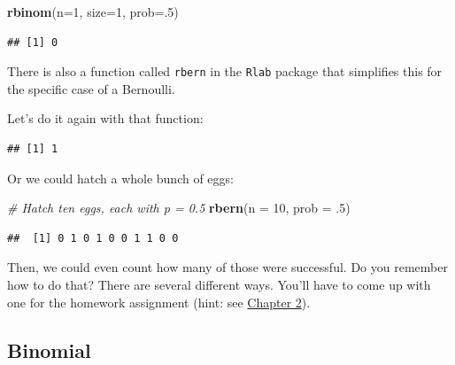 \documentclass[
]{book}
\newenvironment{Shaded}{\begin{snugshade}}{\end{snugshade}}
\newcommand{\CommentTok}[1]{\textcolor[rgb]{0.56,0.35,0.01}{\textit{#1}}}
\newcommand{\DataTypeTok}[1]{\textcolor[rgb]{0.13,0.29,0.53}{#1}}
\newcommand{\DecValTok}[1]{\textcolor[rgb]{0.00,0.00,0.81}{#1}}
\newcommand{\FloatTok}[1]{\textcolor[rgb]{0.00,0.00,0.81}{#1}}
\newcommand{\KeywordTok}[1]{\textcolor[rgb]{0.13,0.29,0.53}{\textbf{#1}}}
\newcommand{\NormalTok}[1]{#1}
\begin{document}
\begin{Shaded}
\begin{Highlighting}[]
\KeywordTok{rbinom}\NormalTok{(}\DataTypeTok{n=}\DecValTok{1}\NormalTok{, }\DataTypeTok{size=}\DecValTok{1}\NormalTok{, }\DataTypeTok{prob=}\NormalTok{.}\DecValTok{5}\NormalTok{)}
\end{Highlighting}
\end{Shaded}

\begin{verbatim}
## [1] 0
\end{verbatim}

There is also a function called \texttt{rbern} in the \texttt{Rlab} package that simplifies this for the specific case of a Bernoulli.

Let's do it again with that function:

\begin{Shaded}
\end{Shaded}

\begin{verbatim}
## [1] 1
\end{verbatim}

Or we could hatch a whole bunch of eggs:

\begin{Shaded}
\begin{Highlighting}[]
\CommentTok{# Hatch ten eggs, each with p = 0.5}
\KeywordTok{rbern}\NormalTok{(}\DataTypeTok{n =} \DecValTok{10}\NormalTok{, }\DataTypeTok{prob =} \FloatTok{.5}\NormalTok{)}
\end{Highlighting}
\end{Shaded}

\begin{verbatim}
##  [1] 0 1 0 1 0 0 1 1 0 0
\end{verbatim}

Then, we could even count how many of those were successful. Do you remember how to do that? There are several different ways. You'll have to come up with one for the homework assignment (hint: see \protect\hyperlink{Chapter2}{Chapter 2}).

\hypertarget{binomial}{%
\subsection{Binomial}\label{binomial}}
\end{document}
